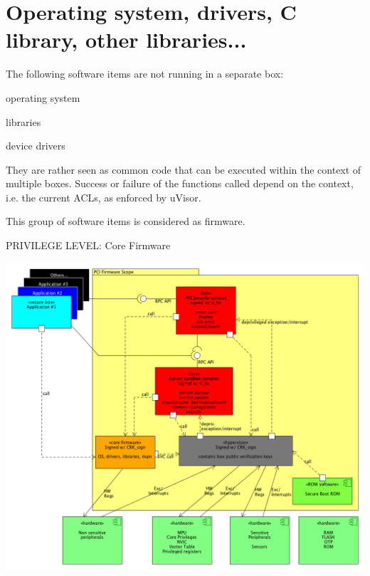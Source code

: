 \hypertarget{group__os}{}\section{Operating system, drivers, C library, other libraries...}
\label{group__os}
The following software items are not running in a separate box\+:


\begin{DoxyItemize}
\item operating system
\item libraries
\item device drivers
\end{DoxyItemize}

They are rather seen as common code that can be executed within the context of multiple boxes. Success or failure of the functions called depend on the context, i.\+e. the current A\+C\+Ls, as enforced by u\+Visor.

This group of software items is considered as firmware.

P\+R\+I\+V\+I\+L\+E\+GE L\+E\+V\+EL\+: Core Firmware 
\begin{DoxyImageNoCaption}
  \mbox{\includegraphics[width=\textwidth,height=\textheight/2,keepaspectratio=true]{pci_cortex.png}}
\end{DoxyImageNoCaption}
  